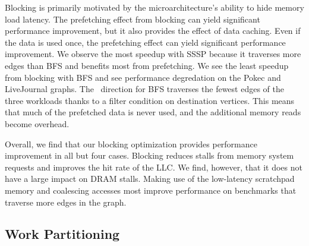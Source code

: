 Blocking is primarily motivated by the microarchitecture's ability to hide memory load latency.
The prefetching effect from blocking can yield significant performance improvement, but it also provides the effect of data caching.
Even if the data is used once, the prefetching effect can yield significant performance improvement. 
We observe the most speedup with SSSP because it traverses more edges than BFS and benefits most from prefetching.
We see the least speedup from blocking with BFS and see performance degredation on the Pokec and LiveJournal graphs.
The \pull~direction for BFS traverses the fewest edges of the three workloads thanks to a filter condition on destination vertices.
This means that much of the prefetched data is never used, and the additional memory reads become overhead.

Overall, we find that our blocking optimization provides performance improvement in all but four cases. 
Blocking reduces stalls from memory system requests and improves the hit rate of the LLC. 
We find, however, that it does not have a large impact on DRAM stalls.
Making use of the low-latency scratchpad memory and coalescing accesses most improve performance on benchmarks that traverse more edges in the graph. 
 
\subsection{Work Partitioning}

